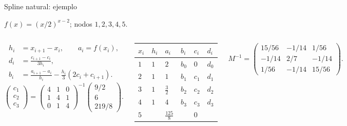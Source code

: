 \documentclass[main.tex]{subfiles}
\begin{document}
\begin{frame}[t]{Spline natural: ejemplo}
\par\noindent\begin{minipage}[t][9mm][t]{\textwidth}\small\strut $f(x)=(x/2)^{x-2}$; nodos $1,2,3,4,5$.\end{minipage}\par\nointerlineskip
\begin{columns}[T]\scriptsize\begin{align*}
h_i&=x_{i+1}-x_i,\qquad a_i=f(x_i),\\
d_i&=\frac{c_{i+1}-c_i}{3h_i},\\
b_i&=\frac{a_{i+1}-a_i}{h_i}-\frac{h_i}{3}(2c_i+c_{i+1}).
\end{align*}\scriptsize\[\begin{pmatrix}c_1\\c_2\\c_3\end{pmatrix}=\begin{pmatrix}4&1&0\\1&4&1\\0&1&4\end{pmatrix}^{-1}\begin{pmatrix}9/2\\6\\219/8\end{pmatrix}.\]\begin{minipage}[t]{\textwidth}\begingroup\scriptsize\setlength{\tabcolsep}{2pt}\begin{center}\begin{tabular}{|C{.12\textwidth}|C{.12\textwidth}|C{.12\textwidth}|C{.12\textwidth}|C{.12\textwidth}|C{.12\textwidth}|}\hline
\rule[-2mm]{0pt}{6mm}$x_i$&$h_i$&$a_i$&$b_i$&$c_i$&$d_i$\\\hline
\rule[-2.5mm]{0pt}{7mm}$1$&$1$&$2$&$b_0$&$0$&$d_0$\\\hline
\rule[-2.5mm]{0pt}{7mm}$2$&$1$&$1$&$b_1$&$c_1$&$d_1$\\\hline
\rule[-2.5mm]{0pt}{7mm}$3$&$1$&$\frac{3}{2}$&$b_2$&$c_2$&$d_2$\\\hline
\rule[-2.5mm]{0pt}{7mm}$4$&$1$&$4$&$b_3$&$c_3$&$d_3$\\\hline
\rule[-2.5mm]{0pt}{7mm}$5$&&$\frac{125}{8}$&&$0$&\\\hline
\end{tabular}\end{center}\endgroup\end{minipage}\par
\scriptsize\[M^{-1}=\begin{pmatrix}15/56&-1/14&1/56\\-1/14&2/7&-1/14\\1/56&-1/14&15/56\end{pmatrix}.\]\end{columns}
\end{frame}
\end{document}
